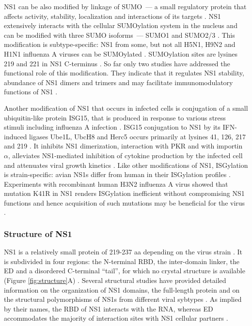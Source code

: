 		\gls{NS1} can be also modified by linkage of \gls{SUMO}~--- a small regulatory protein that affects activity, stability, localization and interactions of its targets \parencite{Johnson2004, Pal2010}. \gls{NS1} extensively interacts with the cellular \gls{SUMO}ylation system in the nucleus and can be modified with three \gls{SUMO} isoforms~--- \gls{SUMO}1 and \gls{SUMO}2/3 \parencite{Pal2011, Santos2013}. This modification is subtype-specific: \gls{NS1} from some, but not all H5N1, H9N2 and H1N1 influenza A viruses can be \gls{SUMO}ylated \parencite{Xu2011}. \gls{SUMO}ylation sites are lysines 219 and 221 in NS1 C-terminus \parencite{Xu2011}. So far only two studies have addressed the functional role of this modification. They indicate that it regulates \gls{NS1} stability, abundance of \gls{NS1} dimers and trimers and may facilitate immunomodulatory functions of \gls{NS1} \parencite{Xu2011, Santos2013}. 
		
		Another modification of \gls{NS1} that occurs in infected cells is conjugation of a small ubiquitin-like protein \gls{ISG15}, that is produced in response to various stress stimuli including influenza A infection \parencite{Pitha-Rowe2007, Sadler2008, Hsiang2009}. \gls{ISG15} conjugation to \gls{NS1} by its \gls{IFN}-induced ligases Ube1L, UbcH8 and Herc5 occurs primarily at lysines 41, 126, 217 and 219 \parencite{Zhao2010, Tang2010a}. It inhibits \gls{NS1} dimerization, interaction with \gls{PKR} and with importin $\alpha$, alleviates \gls{NS1}-mediated inhibition of cytokine production by the infected cell and attenuates viral growth kinetics \parencite{Zhao2010, Tang2010a}. Like other modifications of \gls{NS1}, ISGylation is strain-specific: avian \gls{NS1}s differ from human in their ISGylation profiles \parencite{Tang2010a}. Experiments with recombinant human H3N2 influenza A virus showed that mutation K41R in NS1 renders ISGylation inefficient without compromising \gls{NS1} functions and hence acquisition of such mutations may be beneficial for the virus \parencite{Zhao2010}.
	
		
		\subsubsection{Structure of NS1}
		
		\gls{NS1} is a relatively small protein of 219-237 \gls{aa} depending on the virus strain \parencite{Hale2008b}. It is subdivided in four regions: the N-terminal \gls{RBD}, the inter-domain linker, the \gls{ED} and a disordered C-terminal ``tail'', for which no crystal structure is available (Figure \ref{fig:structure}A) \parencite{Hale2014}. Several structural studies have provided detailed information on the organization of \gls{NS1} domains, the full-length protein and on the structural polymorphisms of \gls{NS1}s from different viral sybtypes \parencite{Chien1997, Liu1997, Wang1999, Bornholdt2006, Yin2007a, Hale2008c, Cheng2009, Xia2009, Kerry2011, Carrillo2014}. As implied by their names, the \gls{RBD} of NS1 interacts with the RNA, whereas \gls{ED} accommodates the majority of interaction sites with \gls{NS1} cellular partners \parencite{Hale2008b}.
		
